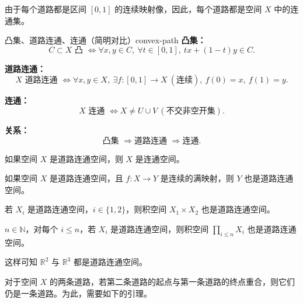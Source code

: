 由于每个道路都是区间 $[0,1]$ 的连续映射像，因此，每个道路都是空间 $X$ 中的连通集。
\begin{note}{凸集、道路连通、连通（简明对比）}{convex-path}
\textbf{凸集：}
\[
C\subset X \text{ 凸 }\iff 
\forall x,y\in C,\ \forall t\in[0,1],\ 
tx+(1-t)y\in C.
\]

\textbf{道路连通：}
\[
X \text{ 道路连通 }\iff 
\forall x,y\in X,\ \exists f:[0,1]\to X\ (\text{连续}),\ f(0)=x,\ f(1)=y.
\]

\textbf{连通：}
\[
X \text{ 连通 }\iff 
X\neq U\cup V\ (\text{不交非空开集}).
\]

\textbf{关系：}
\[
\text{凸集 }\Longrightarrow \text{道路连通 }\Longrightarrow \text{连通}.
\]
\end{note}
\begin{theorem}[道路连通-连通]
如果空间 $X$ 是道路连通空间，则 $X$ 是连通空间。
\end{theorem}
\begin{theorem}[达成连续满映射像集也是连通空间]
如果空间 $X$ 是道路连通空间，且 $f:X\to Y$ 是连续的满映射，则 $Y$ 也是道路连通空间。
\end{theorem}
\begin{theorem}[连通空间的积空间是连通的]
若 $X_i$ 是道路连通空间，$i\in\{1,2\}$，则积空间 $X_1\times X_2$ 也是道路连通空间。
\end{theorem}
\begin{theorem}[有限个道路连通空间的笛卡儿积仍然是道路连通空间]
$n\in\mathbb{N}$，对每个 $i\le n$，若 $X_i$ 是道路连通空间，则积空间 $\prod_{i\le n} X_i$ 也是道路连通空间。
\end{theorem}

这样可知 $\mathbb{R}^2$ 与 $\mathbb{R}^3$ 都是道路连通空间。

对于空间 $X$ 的两条道路，若第二条道路的起点与第一条道路的终点重合，则它们仍是一条道路。为此，需要如下的引理。

